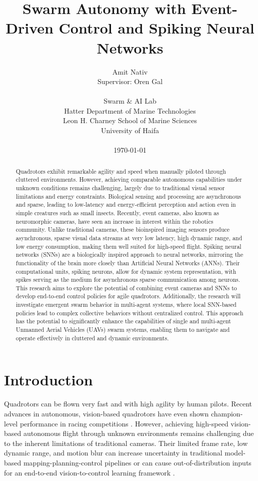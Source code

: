 \documentclass{article}
\title{Swarm Autonomy with Event-Driven Control and Spiking Neural Networks}
\author{
    Amit Nativ \\ 
    Supervisor: Oren Gal \\
    \\
    Swarm \& AI Lab \\
    Hatter Department of Marine Technologies \\
    Leon H. Charney School of Marine Sciences \\
    University of Haifa \\
    \\
    \today
}
\begin{document}
\maketitle

\begin{abstract}
    Quadrotors exhibit remarkable agility and speed when manually piloted through cluttered environments. However, achieving comparable autonomous capabilities under unknown conditions remains challenging, largely due to traditional visual sensor limitations and energy constraints. Biological sensing and processing are asynchronous and sparse, leading to low-latency and energy-efficient perception and action even in simple creatures such as small insects. Recently, event cameras, also known as neuromorphic cameras, have seen an increase in interest within the robotics community. Unlike traditional cameras, these bioinspired imaging sensors produce asynchronous, sparse visual data streams at very low latency, high dynamic range, and low energy consumption, making them well suited for high-speed flight. Spiking neural networks (SNNs) are a biologically inspired approach to neural networks, mirroring the functionality of the brain more closely than Artificial Neural Networks (ANNs). Their computational units, spiking neurons, allow for dynamic system representation, with spikes serving as the medium for asynchronous sparse communication among neurons. This research aims to explore the potential of combining event cameras and SNNs to develop end-to-end control policies for agile quadrotors. Additionally, the research will investigate emergent swarm behavior in multi-agent systems, where local SNN-based policies lead to complex collective behaviors without centralized control. This approach has the potential to significantly enhance the capabilities of single and multi-agent Unmanned Aerial Vehicles (UAVs) swarm systems, enabling them to navigate and operate effectively in cluttered and dynamic environments.
\end{abstract}

\section{Introduction}
Quadrotors can be flown very fast and with high agility by human pilots. Recent advances in autonomous, vision-based quadrotors have even shown champion-level performance in racing competitions \cite{kaufmannChampionlevelDroneRacing2023, romeroDreamFlyModelBased2025a, loquercioLearningHighSpeedFlight2021}. However, achieving high-speed vision-based autonomous flight through unknown environments remains challenging due to the inherent limitations of traditional cameras. Their limited frame rate, low dynamic range, and motion blur can increase uncertainty in traditional model-based mapping-planning-control pipelines or can cause out-of-distribution inputs for an end-to-end vision-to-control learning framework \cite{bhattacharyaVisionTransformersEndtoEnd2025}. 
\end{document}

